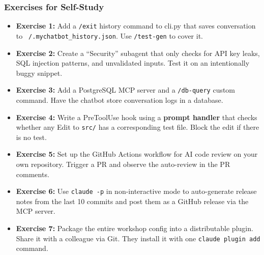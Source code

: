 \begin{frame}[fragile]\frametitle{Exercises for Self-Study}
  \begin{itemize}
    \item \textbf{Exercise 1:} Add a \texttt{/exit} history command to cli.py that saves conversation to \texttt{~/.mychatbot\_history.json}. Use \texttt{/test-gen} to cover it.
    \item \textbf{Exercise 2:} Create a ``Security'' subagent that only checks for API key leaks, SQL injection patterns, and unvalidated inputs. Test it on an intentionally buggy snippet.
    \item \textbf{Exercise 3:} Add a PostgreSQL MCP server and a \texttt{/db-query} custom command. Have the chatbot store conversation logs in a database.
    \item \textbf{Exercise 4:} Write a PreToolUse hook using a \textbf{prompt handler} that checks whether any Edit to \texttt{src/} has a corresponding test file. Block the edit if there is no test.
    \item \textbf{Exercise 5:} Set up the GitHub Actions workflow for AI code review on your own repository. Trigger a PR and observe the auto-review in the PR comments.
    \item \textbf{Exercise 6:} Use \texttt{claude -p} in non-interactive mode to auto-generate release notes from the last 10 commits and post them as a GitHub release via the MCP server.
    \item \textbf{Exercise 7:} Package the entire workshop config into a distributable plugin. Share it with a colleague via Git. They install it with one \texttt{claude plugin add} command.
  \end{itemize}
\end{frame}


